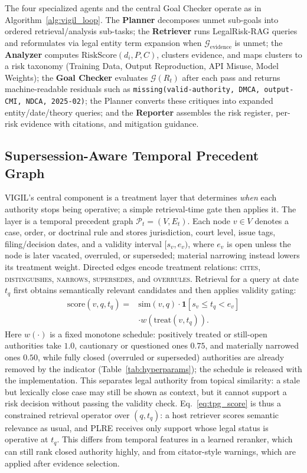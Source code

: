 The four specialized agents and the central Goal Checker operate as in Algorithm~\ref{alg:vigil_loop}. The \textbf{Planner} decomposes unmet sub-goals into ordered retrieval/analysis sub-tasks; the \textbf{Retriever} runs LegalRisk-RAG queries and reformulates via legal entity term expansion when $\mathcal{G}_{\text{evidence}}$ is unmet; the \textbf{Analyzer} computes $\text{RiskScore}(d_i, P, C)$, clusters evidence, and maps clusters to a risk taxonomy (Training Data, Output Reproduction, API Misuse, Model Weights); the \textbf{Goal Checker} evaluates $\mathcal{G}(R_t)$ after each pass and returns machine-readable residuals such as \texttt{missing(valid-authority, DMCA, output-CMI, NDCA, 2025-02)}; the Planner converts these critiques into expanded entity/date/theory queries; and the \textbf{Reporter} assembles the risk register, per-risk evidence with citations, and mitigation guidance.

\subsection{Supersession-Aware Temporal Precedent Graph}
\label{sec:tpg}

VIGIL's central component is a treatment layer that determines \emph{when} each authority stops being operative; a simple retrieval-time gate then applies it. The layer is a temporal precedent graph $\mathcal{P}_t=(V,E_t)$. Each node $v\in V$ denotes a case, order, or doctrinal rule and stores jurisdiction, court level, issue tags, filing/decision dates, and a validity interval $[s_v,e_v)$, where $e_v$ is open unless the node is later vacated, overruled, or superseded; material narrowing instead lowers its treatment weight. Directed edges encode treatment relations: \textsc{cites}, \textsc{distinguishes}, \textsc{narrows}, \textsc{supersedes}, and \textsc{overrules}. Retrieval for a query at date $t_q$ first obtains semantically relevant candidates and then applies validity gating:
\begin{equation}
\label{eq:tpg_score}
\begin{split}
  \mathrm{score}(v,q,t_q)={}&\mathrm{sim}(v,q)\cdot \mathbf{1}[s_v\!\le\! t_q\!<\! e_v]\\
  &\cdot w(\mathrm{treat}(v,t_q)).
\end{split}
\end{equation}
Here $w(\cdot)$ is a fixed monotone schedule: positively treated or still-open authorities take $1.0$, cautionary or questioned ones $0.75$, and materially narrowed ones $0.50$, while fully closed (overruled or superseded) authorities are already removed by the indicator (Table~\ref{tab:hyperparams}); the schedule is released with the implementation. This separates legal authority from topical similarity: a stale but lexically close case may still be shown as context, but it cannot support a risk decision without passing the validity check. Eq.~\eqref{eq:tpg_score} is thus a constrained retrieval operator over $(q,t_q)$: a host retriever scores semantic relevance as usual, and PLRE receives only support whose legal status is operative at $t_q$. This differs from temporal features in a learned reranker, which can still rank closed authority highly, and from citator-style warnings, which are applied after evidence selection.

